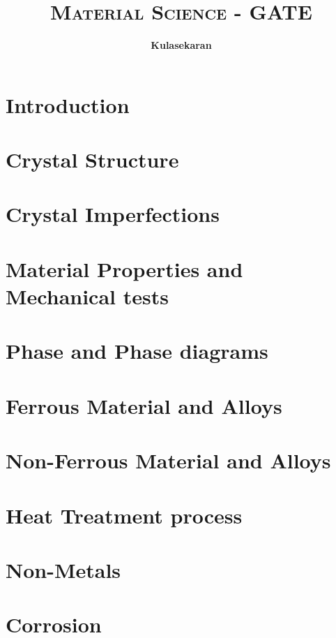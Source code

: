\documentclass[8pt]{report}
\title{\Huge{\textsc{Material Science - GATE}}}
\author{\huge{\textbf{Kulasekaran}}}
\begin{document}
\maketitle
\tableofcontents
\chapter{Introduction}
\chapter{Crystal Structure}
\chapter{Crystal Imperfections}
\chapter{Material Properties and Mechanical tests}
\chapter{Phase and Phase diagrams}
\chapter{Ferrous Material and Alloys}
\chapter{Non-Ferrous Material and Alloys}
\chapter{Heat Treatment process}
\chapter{Non-Metals}
\chapter{Corrosion}
\end{document}
